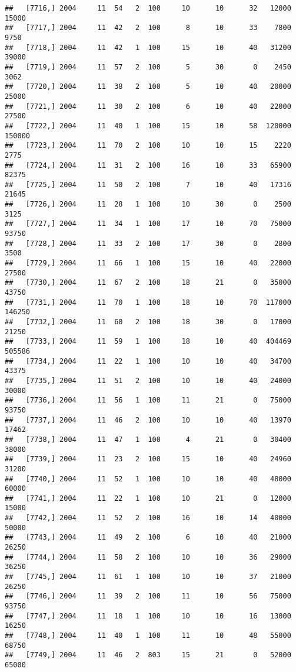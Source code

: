 \documentclass{article}\usepackage[]{graphicx}\usepackage[]{color}
\makeatletter
\newenvironment{kframe}{%
 \def\at@end@of@kframe{}%
 \ifinner\ifhmode%
  \def\at@end@of@kframe{\end{minipage}}%
  \begin{minipage}{\columnwidth}%
 \fi\fi%
 \def\FrameCommand##1{\hskip\@totalleftmargin \hskip-\fboxsep
 \colorbox{shadecolor}{##1}\hskip-\fboxsep
     \hskip-\linewidth \hskip-\@totalleftmargin \hskip\columnwidth}%
 \MakeFramed {\advance\hsize-\width
   \@totalleftmargin\z@ \linewidth\hsize
   \@setminipage}}%
 {\par\unskip\endMakeFramed%
 \at@end@of@kframe}
\newenvironment{knitrout}{}{} %
\makeatother
\begin{document}
\begin{knitrout}
\begin{kframe}
\begin{verbatim}
##   [7716,] 2004     11  54   2  100     10      10      32   12000   15000
##   [7717,] 2004     11  42   2  100      8      10      33    7800    9750
##   [7718,] 2004     11  42   1  100     15      10      40   31200   39000
##   [7719,] 2004     11  57   2  100      5      30       0    2450    3062
##   [7720,] 2004     11  38   2  100      5      10      40   20000   25000
##   [7721,] 2004     11  30   2  100      6      10      40   22000   27500
##   [7722,] 2004     11  40   1  100     15      10      58  120000  150000
##   [7723,] 2004     11  70   2  100     10      10      15    2220    2775
##   [7724,] 2004     11  31   2  100     16      10      33   65900   82375
##   [7725,] 2004     11  50   2  100      7      10      40   17316   21645
##   [7726,] 2004     11  28   1  100     10      30       0    2500    3125
##   [7727,] 2004     11  34   1  100     17      10      70   75000   93750
##   [7728,] 2004     11  33   2  100     17      30       0    2800    3500
##   [7729,] 2004     11  66   1  100     15      10      40   22000   27500
##   [7730,] 2004     11  67   2  100     18      21       0   35000   43750
##   [7731,] 2004     11  70   1  100     18      10      70  117000  146250
##   [7732,] 2004     11  60   2  100     18      30       0   17000   21250
##   [7733,] 2004     11  59   1  100     18      10      40  404469  505586
##   [7734,] 2004     11  22   1  100     10      10      40   34700   43375
##   [7735,] 2004     11  51   2  100     10      10      40   24000   30000
##   [7736,] 2004     11  56   1  100     11      21       0   75000   93750
##   [7737,] 2004     11  46   2  100     10      10      40   13970   17462
##   [7738,] 2004     11  47   1  100      4      21       0   30400   38000
##   [7739,] 2004     11  23   2  100     15      10      40   24960   31200
##   [7740,] 2004     11  52   1  100     10      10      40   48000   60000
##   [7741,] 2004     11  22   1  100     10      21       0   12000   15000
##   [7742,] 2004     11  52   2  100     16      10      14   40000   50000
##   [7743,] 2004     11  49   2  100      6      10      40   21000   26250
##   [7744,] 2004     11  58   2  100     10      10      36   29000   36250
##   [7745,] 2004     11  61   1  100     10      10      37   21000   26250
##   [7746,] 2004     11  39   2  100     11      10      56   75000   93750
##   [7747,] 2004     11  18   1  100     10      10      16   13000   16250
##   [7748,] 2004     11  40   1  100     11      10      48   55000   68750
##   [7749,] 2004     11  46   2  803     15      21       0   52000   65000

\end{verbatim}
\end{kframe}
\end{knitrout}
\end{document}
